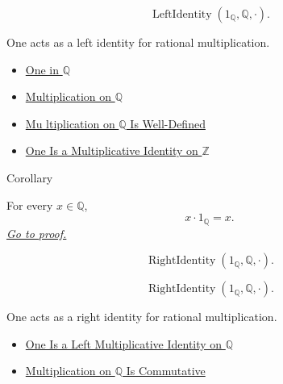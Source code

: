 \begin{remark*}
\[
\operatorname{LeftIdentity}(1_{\mathbb{Q}},\mathbb{Q},\cdot).
\]
\end{remark*}

\begin{remark*}[Interpretation]
One acts as a left identity for rational multiplication.
\end{remark*}

\begin{dependencies}
\begin{itemize}
  \item \hyperref[def:one-in-q]{One in $\mathbb{Q}$}
  \item \hyperref[def:multiplication-on-q-classes]{Multiplication on $\mathbb{Q}$}
  \item \hyperref[thm:multiplication-on-q-well-defined]{Mu
ltiplication on $\mathbb{Q}$ Is Well-Defined}
  \item \hyperref[thm:one-multiplicative-identity-on-z]{One Is a Multiplicative Identity on $\mathbb{Z}$}
\end{itemize}
\end{dependencies}

\begin{corollarybox}{Corollary}
\begin{corollary}
\label{cor:one-right-multiplicative-identity-on-q}
For every $x\in\mathbb{Q}$,
\[
x\cdot 1_{\mathbb{Q}}=x.
\]
\hyperref[prf:one-right-multiplicative-identity-on-q]{\textit{Go to proof.}}
\end{corollary}
\end{corollarybox}

\begin{remark*}
\[
\operatorname{RightIdentity}(1_{\mathbb{Q}},\mathbb{Q},\cdot).
\]
\end{remark*}

\begin{remark*}
\[
\operatorname{RightIdentity}(1_{\mathbb{Q}},\mathbb{Q},\cdot).
\]
\end{remark*}

\begin{remark*}[Interpretation]
One acts as a right identity for rational multiplication.
\end{remark*}

\begin{dependencies}
\begin{itemize}
  \item \hyperref[thm:one-left-multiplicative-identity-on-q]{One Is a Left Multiplicative Identity on $\mathbb{Q}$}
  \item \hyperref[thm:multiplication-on-q-commutative]{Multiplication on $\mathbb{Q}$ Is Commutative}
\end{itemize}
\end{dependencies}

